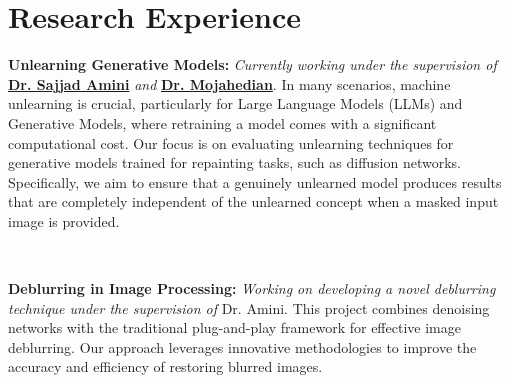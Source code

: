 \documentclass[letterpaper,11pt]{article}
\newcommand{\resumeSubHeadingListStart}{\begin{itemize}[leftmargin=0.15in, label={}]}
\newcommand{\resumeSubHeadingListEnd}{\end{itemize}}
\begin{document}
        \section{Research Experience}
        \vspace{2pt}
        \resumeSubHeadingListStart
        \small{ \item{

        \textbf{Unlearning Generative Models:} 
        \textit{Currently working under the supervision of} 
        \href{https://scholar.google.com/citations?user=24GngZYAAAAJ&hl=en}{\textbf{Dr. Sajjad Amini}} 
        \textit{and} 
        \href{https://scholar.google.com/citations?user=SqASevMAAAAJ&hl=en}{\textbf{Dr. Mojahedian}}. 
        In many scenarios, machine unlearning is crucial, particularly for Large Language Models (LLMs) and Generative Models, where retraining a model comes with a significant computational cost. 
        Our focus is on evaluating unlearning techniques for generative models trained for repainting tasks, such as diffusion networks. Specifically, we aim to ensure that a genuinely unlearned model produces results that are completely independent of the unlearned concept when a masked input image is provided.
        } \\
        \vspace{4pt}
        \item{
            \textbf{Deblurring in Image Processing:}
            \textit{Working on developing a novel deblurring technique under the supervision of} 
            Dr. Amini.
            This project combines denoising networks with the traditional plug-and-play framework for effective image deblurring. Our approach leverages innovative methodologies to improve the accuracy and efficiency of restoring blurred images.
            }
        }
        \resumeSubHeadingListEnd

\end{document}
